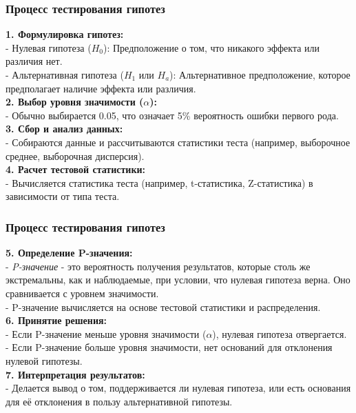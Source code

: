 \documentclass[aspectratio=169]{beamer}
\begin{document}
\begin{frame}
\frametitle{Процесс тестирования гипотез}
{\bf 1. Формулировка гипотез:}\\
- Нулевая гипотеза ($H_0$): Предположение о том, что никакого эффекта или различия нет.\\
- Альтернативная гипотеза ($H_1$ или $H_a$): Альтернативное предположение, которое предполагает наличие эффекта или различия.\\
{\bf 2. Выбор уровня значимости ($\alpha$):}\\
- Обычно выбирается 0.05, что означает 5\% вероятность ошибки первого рода.\\
{\bf 3. Сбор и анализ данных:}\\
- Собираются данные и рассчитываются статистики теста (например, выборочное среднее, выборочная дисперсия).\\
{\bf 4. Расчет тестовой статистики:}\\
- Вычисляется статистика теста (например, t-статистика, Z-статистика) в зависимости от типа теста.
\end{frame}

\begin{frame}
\frametitle{Процесс тестирования гипотез}
{\bf 5. Определение P-значения:}\\
- {\it P-значение} - это вероятность получения результатов, которые столь же экстремальны, как и наблюдаемые, при условии, что нулевая гипотеза верна. Оно сравнивается с уровнем значимости.\\
- P-значение вычисляется на основе тестовой статистики и распределения.\\
{\bf 6. Принятие решения:}\\
- Если P-значение меньше уровня значимости ($\alpha$), нулевая гипотеза отвергается.\\
- Если P-значение больше уровня значимости, нет оснований для отклонения нулевой гипотезы.\\
{\bf 7. Интерпретация результатов:}\\
- Делается вывод о том, поддерживается ли нулевая гипотеза, или есть основания для её отклонения в пользу альтернативной гипотезы.
\end{frame}
\end{document}
